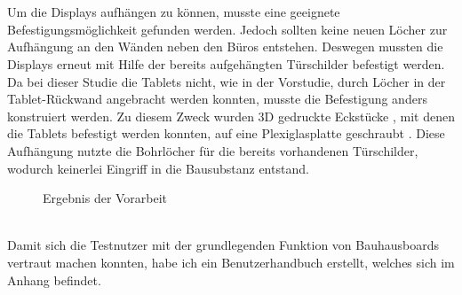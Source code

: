 \\
\\
Um die Displays aufhängen zu können, musste eine geeignete Befestigungsmöglichkeit gefunden werden.
Jedoch sollten keine neuen Löcher zur Aufhängung an den Wänden neben den Büros entstehen.
Deswegen mussten die Displays erneut mit Hilfe der bereits aufgehängten Türschilder befestigt werden.
Da bei dieser Studie die Tablets nicht, wie in der Vorstudie, durch Löcher in der Tablet-Rückwand angebracht werden konnten, musste die Befestigung anders konstruiert werden.
Zu diesem Zweck wurden 3D gedruckte Eckstücke , mit denen die Tablets befestigt werden konnten, auf eine Plexiglasplatte geschraubt .
Diese Aufhängung nutzte die Bohrlöcher für die bereits vorhandenen Türschilder, wodurch keinerlei Eingriff in die Bausubstanz entstand.
\begin{figure}%
  \centering
  \caption{Ergebnis der Vorarbeit}
  \label{img:Vorarbeit}
\end{figure}
\\
Damit sich die Testnutzer mit der grundlegenden Funktion von Bauhausboards vertraut machen konnten, habe ich ein Benutzerhandbuch erstellt, welches sich im Anhang befindet.

